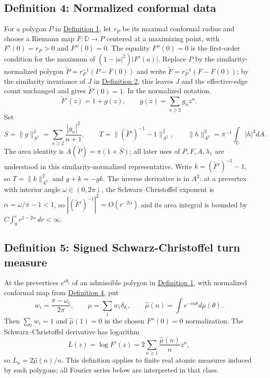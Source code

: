\documentclass[11pt]{article}
\begin{document}
\subsection{Definition 4: Normalized conformal
data}\label{def-conformal-data}

For a polygon \(P\) in \hyperref[def-admissible-polygon]{Definition 1},
let \(r_P\) be its maximal conformal radius and choose a Riemann map
\(F:\mathbb D\to P\) centered at a maximizing point, with
\(F'(0)=r_P>0\) and \(F''(0)=0\). The equality \(F''(0)=0\) is the
first-order condition for the maximum of \((1-|a|^2)|F'(a)|\). Replace
\(P\) by the similarity-normalized polygon
\(\widetilde P=r_P^{-1}(P-F(0))\) and write
\(\widetilde F=r_P^{-1}(F-F(0))\); by the similarity invariance of \(J\)
in \hyperref[def-j-functional]{Definition 2}, this leaves \(J\) and the
effective-edge count unchanged and gives \(\widetilde F'(0)=1\). In the
normalized notation, \[
\widetilde F'(z)=1+g(z),\qquad g(z)=\sum_{n\ge2}g_nz^n.
\] Set \[
S=\|g\|_{A^2}^2=\sum_{n\ge2}\frac{|g_n|^2}{n+1},\qquad
T=\|(\widetilde F')^{-1}-1\|_{A^2}^2,\qquad \|h\|_{A^2}^2=\pi^{-1}\int_{\mathbb D}|h|^2dA.
\] The area identity is \(A(\widetilde P)=\pi(1+S)\); all later uses of
\(P,F,A,\lambda_1\) are understood in this similarity-normalized
representative. Write \(k=(\widetilde F')^{-1}-1\), so
\(T=\|k\|_{A^2}^2\) and \(g+k=-gk\). The inverse derivative is in
\(A^2\): at a prevertex with interior angle \(\omega\in(0,2\pi)\), the
Schwarz--Christoffel exponent is \(\alpha=\omega/\pi-1<1\), so
\(|(\widetilde F')^{-1}|^2=O(r^{-2\alpha})\) and its area integral is
bounded by \(C\int_0^\varepsilon r^{1-2\alpha}\,dr<\infty\).

\subsection{Definition 5: Signed Schwarz-Christoffel turn
measure}\label{def-turn-measure}

At the prevertices \(e^{i\theta_i}\) of an admissible polygon in
\hyperref[def-admissible-polygon]{Definition 1}, with normalized
conformal map from \hyperref[def-conformal-data]{Definition 4}, put \[
w_i=\frac{\pi-\omega_i}{2\pi},\qquad
\mu=\sum_iw_i\delta_{\theta_i},\qquad \widehat\mu(n)=\int e^{-in\theta}d\mu(\theta).
\] Then \(\sum_iw_i=1\) and \(\widehat\mu(1)=0\) in the chosen
\(F''(0)=0\) normalization. The Schwarz--Christoffel derivative has
logarithm \[
L(z)=\log F'(z)=2\sum_{n\ge1}\frac{\widehat\mu(n)}n z^n,
\] so \(L_n=2\widehat\mu(n)/n\). This definition applies to finite real
atomic measures induced by such polygons; all Fourier series below are
interpreted in that class.
\end{document}
